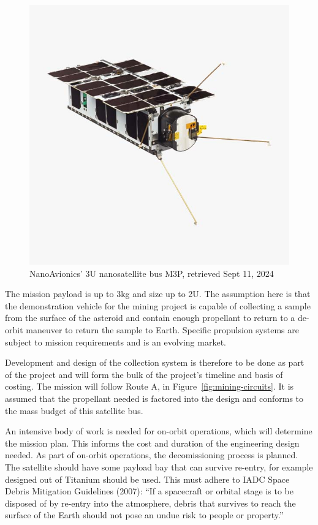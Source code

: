 \documentclass[conference]{IEEEtran}
\begin{document}
\begin{figure}[H]
\centering
\includegraphics[width=\linewidth]{nano-av-3U.jpg}
\caption{\label{fig:nano-av-3U}NanoAvionics' 3U nanosatellite bus M3P, retrieved Sept 11, 2024 \cite{nanoavionics-2023}}
\end{figure}

The mission payload is up to 3kg and size up to 2U. The assumption here is that the demonstration vehicle for the mining project is capable of collecting a sample from the surface of the asteroid and contain enough propellant to return to a de-orbit maneuver to return the sample to Earth. Specific propulsion systems are subject to mission requirements \cite{zakirov-2001} and is an evolving market.

Development and design of the collection system is therefore to be done as part of the project and will form the bulk of the project's timeline and basis of costing. The mission will follow Route A, in Figure~\ref{fig:mining-circuits}. It is assumed that the propellant needed is factored into the design and conforms to the mass budget of this satellite bus.

An intensive body of work is needed for on-orbit operations, which will determine the mission plan. This informs the cost and duration of the engineering design needed. As part of on-orbit operations, the decomissioning process is planned. The satellite should have some payload bay that can survive re-entry, for example designed out of Titanium should be used. This must adhere to  IADC Space Debris Mitigation Guidelines (2007): “If a spacecraft or orbital stage is to be disposed of by re-entry into the atmosphere, debris that survives to reach the surface of the Earth should not pose an undue risk to people or property.” 
\end{document}
